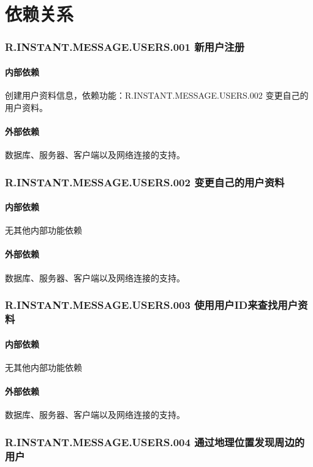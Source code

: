\chapter{依赖关系}

\subsection{R.INSTANT.MESSAGE.USERS.001 新用户注册}
\subsubsection{内部依赖}
    创建用户资料信息，依赖功能：R.INSTANT.MESSAGE.USERS.002 变更自己的用户资料。
\subsubsection{外部依赖}
    数据库、服务器、客户端以及网络连接的支持。

\subsection{R.INSTANT.MESSAGE.USERS.002 变更自己的用户资料}
\subsubsection{内部依赖}
    无其他内部功能依赖
\subsubsection{外部依赖}
    数据库、服务器、客户端以及网络连接的支持。

\subsection{R.INSTANT.MESSAGE.USERS.003 使用用户ID来查找用户资料}
\subsubsection{内部依赖}
    无其他内部功能依赖
\subsubsection{外部依赖}
    数据库、服务器、客户端以及网络连接的支持。

\subsection{R.INSTANT.MESSAGE.USERS.004 通过地理位置发现周边的用户}
